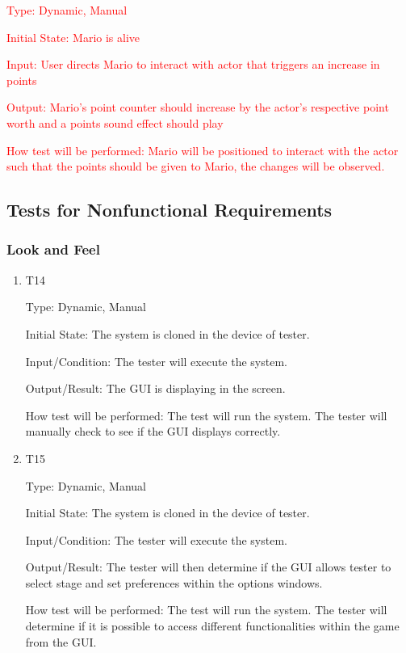 \documentclass[12pt, titlepage]{article}
\begin{document}
\begin{enumerate}
\textcolor{red}{Type: Dynamic, Manual}

\textcolor{red}{Initial State: Mario is alive}

\textcolor{red}{Input: User directs Mario to interact with actor that triggers an increase in points}

\textcolor{red}{Output: Mario's point counter should increase by the actor's respective point worth and a points sound effect should play}

\textcolor{red}{How test will be performed: Mario will be positioned to interact with the actor such that the points should be given to Mario, the changes will be observed.}


\end{enumerate}

\subsection{Tests for Nonfunctional Requirements}

\subsubsection{Look and Feel}

\begin{enumerate}

\item{T14}

Type: Dynamic, Manual

Initial State: The system is cloned in the device of tester.

Input/Condition: The tester will execute the system.

Output/Result: The GUI is displaying in the screen.

How test will be performed: The test will run the system. The tester will manually check to see if the GUI displays correctly.

\item{T15}

Type: Dynamic, Manual

Initial State: The system is cloned in the device of tester.

Input/Condition: The tester will execute the system.

Output/Result:  The tester will then determine if the GUI allows tester to select stage and set preferences within the options windows.

How test will be performed: The test will run the system. The tester will determine if it is possible to access different functionalities within the game from the GUI.

\end{enumerate}
\end{document}
